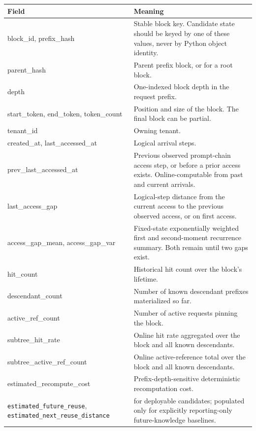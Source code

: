 \documentclass[11pt]{article}
\newcommand{\code}[1]{\texttt{\detokenize{#1}}}
\newcommand{\identifier}[1]{\nolinkurl{#1}}
\begin{document}
\begin{longtable}{>{\ttfamily}p{}
                  >{\raggedright\arraybackslash}p{}}
\toprule
\normalfont\textbf{Field} & \textbf{Meaning} \\
\midrule
\endhead
block\_id, prefix\_hash & Stable block key.  Candidate state should be keyed by one of
these values, never by Python object identity. \\
parent\_hash & Parent prefix block, or \code{None} for a root block. \\
depth & One-indexed block depth in the request prefix. \\
start\_token, end\_token, token\_count & Position and size of the block.  The final
block can be partial. \\
tenant\_id & Owning tenant. \\
created\_at, last\_accessed\_at & Logical arrival steps. \\
prev\_last\_accessed\_at & Previous observed prompt-chain access step, or \code{None}
before a prior access exists.  Online-computable from past and current arrivals. \\
last\_access\_gap & Logical-step distance from the current access to the previous
observed access, or \code{None} on first access. \\
access\_gap\_mean, access\_gap\_var & Fixed-state exponentially weighted first and
second-moment recurrence summary.  Both remain \code{None} until two gaps exist. \\
hit\_count & Historical hit count over the block's lifetime. \\
descendant\_count & Number of known descendant prefixes materialized so far. \\
active\_ref\_count & Number of active requests pinning the block. \\
subtree\_hit\_rate & Online hit rate aggregated over the block and all known
descendants. \\
subtree\_active\_ref\_count & Online active-reference total over the block and all known
descendants. \\
estimated\_recompute\_cost & Prefix-depth-sensitive deterministic recomputation cost. \\
\identifier{estimated_future_reuse}, \identifier{estimated_next_reuse_distance} &
\code{None} for deployable candidates; populated only for explicitly reporting-only
future-knowledge baselines. \\
\bottomrule
\end{longtable}
\end{document}
